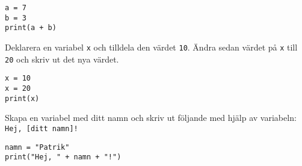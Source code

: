 \begin{solution}
\begin{lstlisting}
a = 7
b = 3
print(a + b)
\end{lstlisting}
\end{solution}

\begin{exercise}
Deklarera en variabel \texttt{x} och tilldela den värdet \texttt{10}. Ändra sedan värdet på \texttt{x} till \texttt{20} och skriv ut det nya värdet.
\end{exercise}

\begin{solution}
\begin{lstlisting}
x = 10
x = 20
print(x)
\end{lstlisting}
\end{solution}

\begin{exercise}
Skapa en variabel med ditt namn och skriv ut följande med hjälp av variabeln: \texttt{Hej, [ditt namn]!}
\end{exercise}

\begin{solution}
\begin{lstlisting}
namn = "Patrik"
print("Hej, " + namn + "!")
\end{lstlisting}
\end{solution}


